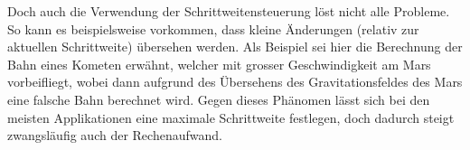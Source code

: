Doch auch die Verwendung der Schrittweitensteuerung löst nicht alle Probleme.
So kann es beispielsweise vorkommen, dass kleine Änderungen (relativ zur aktuellen Schrittweite) übersehen werden.
Als Beispiel sei hier die Berechnung der Bahn eines Kometen erwähnt, welcher mit grosser Geschwindigkeit am Mars vorbeifliegt,
wobei dann aufgrund des Übersehens des Gravitationsfeldes des Mars eine falsche Bahn berechnet wird.
Gegen dieses Phänomen lässt sich bei den meisten Applikationen eine maximale Schrittweite festlegen,
doch dadurch steigt zwangsläufig auch der Rechenaufwand.

